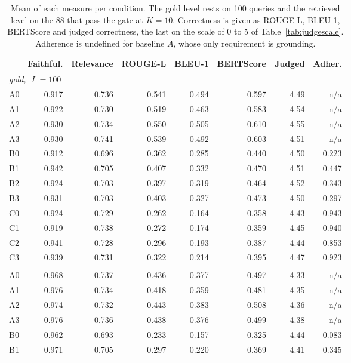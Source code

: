 \documentclass[12pt,a4paper,oneside]{scrreprt}
\begin{document}
\begin{table}[htbp]
\centering
\caption{Mean of each measure per condition. The gold level rests on 100 queries and the retrieved level on the 88 that pass the gate at $K = 10$. Correctness is given as ROUGE-L, BLEU-1, BERTScore and judged correctness, the last on the scale of 0 to 5 of Table~\ref{tab:judgescale}. Adherence is undefined for baseline $A$, whose only requirement is grounding.}
\label{tab:cellmeans}
\setlength{\tabcolsep}{2pt}
\begin{tabular}{lrrrrrrr}
\toprule
 & Faithful. & Relevance & ROUGE-L & BLEU-1 & BERTScore & Judged & Adher. \\
\midrule
\multicolumn{8}{l}{\textit{gold, $|I| = 100$}} \\
A0 & 0.917 & 0.736 & 0.541 & 0.494 & 0.597 & 4.49 & n/a \\
A1 & 0.922 & 0.730 & 0.519 & 0.463 & 0.583 & 4.54 & n/a \\
A2 & 0.930 & 0.734 & 0.550 & 0.505 & 0.610 & 4.55 & n/a \\
A3 & 0.930 & 0.741 & 0.539 & 0.492 & 0.603 & 4.51 & n/a \\
B0 & 0.912 & 0.696 & 0.362 & 0.285 & 0.440 & 4.50 & 0.223 \\
B1 & 0.942 & 0.705 & 0.407 & 0.332 & 0.470 & 4.51 & 0.447 \\
B2 & 0.924 & 0.703 & 0.397 & 0.319 & 0.464 & 4.52 & 0.343 \\
B3 & 0.931 & 0.703 & 0.403 & 0.327 & 0.473 & 4.50 & 0.297 \\
C0 & 0.924 & 0.729 & 0.262 & 0.164 & 0.358 & 4.43 & 0.943 \\
C1 & 0.919 & 0.738 & 0.272 & 0.174 & 0.359 & 4.45 & 0.940 \\
C2 & 0.941 & 0.728 & 0.296 & 0.193 & 0.387 & 4.44 & 0.853 \\
C3 & 0.939 & 0.731 & 0.322 & 0.214 & 0.395 & 4.47 & 0.923 \\
\addlinespace
\multicolumn{8}{l}{\textit{retrieved, $K = 10$, $|I| = 88$}} \\
A0 & 0.968 & 0.737 & 0.436 & 0.377 & 0.497 & 4.33 & n/a \\
A1 & 0.976 & 0.734 & 0.418 & 0.359 & 0.481 & 4.35 & n/a \\
A2 & 0.974 & 0.732 & 0.443 & 0.383 & 0.508 & 4.36 & n/a \\
A3 & 0.976 & 0.736 & 0.438 & 0.376 & 0.499 & 4.38 & n/a \\
B0 & 0.962 & 0.693 & 0.233 & 0.157 & 0.325 & 4.44 & 0.083 \\
B1 & 0.971 & 0.705 & 0.297 & 0.220 & 0.369 & 4.41 & 0.345 \\

\end{tabular}
\end{table}
\end{document}
